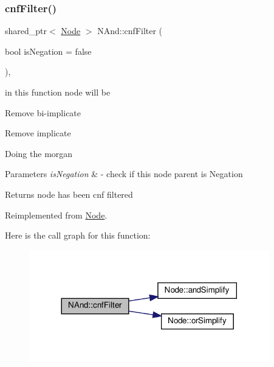 \subsubsection{\texorpdfstring{cnf\+Filter()}{cnfFilter()}}
{\footnotesize\ttfamily shared\+\_\+ptr$<$ \hyperlink{class_node}{Node} $>$ N\+And\+::cnf\+Filter (\begin{DoxyParamCaption}\item[{bool}]{is\+Negation = {\ttfamily false} }\end{DoxyParamCaption})\hspace{0.3cm}{\ttfamily [override]}, {\ttfamily [virtual]}}



in this function node will be 


\begin{DoxyItemize}
\item Remove bi-\/implicate
\item Remove implicate
\item Doing the morgan 
\begin{DoxyParams}{Parameters}
{\em is\+Negation} & -\/ check if this node parent is Negation \\
\hline
\end{DoxyParams}
\begin{DoxyReturn}{Returns}
node has been cnf filtered 
\end{DoxyReturn}

\end{DoxyItemize}

Reimplemented from \hyperlink{class_node_ab5b01fd3c4efe0f2eaf7fc41653359b7}{Node}.

Here is the call graph for this function\+:\nopagebreak
\begin{figure}[H]
\begin{center}
\leavevmode
\includegraphics[width=296pt]{d9/d44/class_n_and_a2df64f0858e90841201a2acaf50ac587_cgraph}
\end{center}
\end{figure}
\mbox{\label{class_n_and_a3756b0f2696bf06664100c0b5c9d67b3}} 
